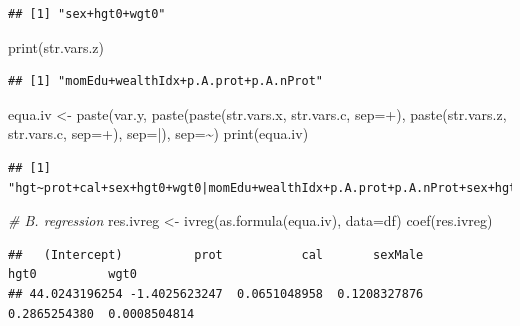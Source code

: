\documentclass[
]{book}
\newenvironment{Shaded}{\begin{snugshade}}{\end{snugshade}}
\newcommand{\AttributeTok}[1]{\textcolor[rgb]{0.77,0.63,0.00}{#1}}
\newcommand{\CommentTok}[1]{\textcolor[rgb]{0.56,0.35,0.01}{\textit{#1}}}
\newcommand{\FunctionTok}[1]{\textcolor[rgb]{0.00,0.00,0.00}{#1}}
\newcommand{\NormalTok}[1]{#1}
\newcommand{\OtherTok}[1]{\textcolor[rgb]{0.56,0.35,0.01}{#1}}
\newcommand{\StringTok}[1]{\textcolor[rgb]{0.31,0.60,0.02}{#1}}
\begin{document}
\begin{verbatim}
## [1] "sex+hgt0+wgt0"
\end{verbatim}

\begin{Shaded}
\begin{Highlighting}[]
\FunctionTok{print}\NormalTok{(str.vars.z)}
\end{Highlighting}
\end{Shaded}

\begin{verbatim}
## [1] "momEdu+wealthIdx+p.A.prot+p.A.nProt"
\end{verbatim}

\begin{Shaded}
\begin{Highlighting}[]
\NormalTok{equa.iv }\OtherTok{\textless{}{-}} \FunctionTok{paste}\NormalTok{(var.y,}
                 \FunctionTok{paste}\NormalTok{(}\FunctionTok{paste}\NormalTok{(str.vars.x, str.vars.c, }\AttributeTok{sep=}\StringTok{\textquotesingle{}+\textquotesingle{}}\NormalTok{),}
                       \FunctionTok{paste}\NormalTok{(str.vars.z, str.vars.c, }\AttributeTok{sep=}\StringTok{\textquotesingle{}+\textquotesingle{}}\NormalTok{),}
                       \AttributeTok{sep=}\StringTok{\textquotesingle{}|\textquotesingle{}}\NormalTok{),}
                 \AttributeTok{sep=}\StringTok{\textquotesingle{}\textasciitilde{}\textquotesingle{}}\NormalTok{)}
\FunctionTok{print}\NormalTok{(equa.iv)}
\end{Highlighting}
\end{Shaded}

\begin{verbatim}
## [1] "hgt~prot+cal+sex+hgt0+wgt0|momEdu+wealthIdx+p.A.prot+p.A.nProt+sex+hgt0+wgt0"
\end{verbatim}

\begin{Shaded}
\begin{Highlighting}[]
\CommentTok{\# B. regression}
\NormalTok{res.ivreg }\OtherTok{\textless{}{-}} \FunctionTok{ivreg}\NormalTok{(}\FunctionTok{as.formula}\NormalTok{(equa.iv), }\AttributeTok{data=}\NormalTok{df)}
\FunctionTok{coef}\NormalTok{(res.ivreg)}
\end{Highlighting}
\end{Shaded}

\begin{verbatim}
##   (Intercept)          prot           cal       sexMale          hgt0          wgt0 
## 44.0243196254 -1.4025623247  0.0651048958  0.1208327876  0.2865254380  0.0008504814
\end{verbatim}
\end{document}
